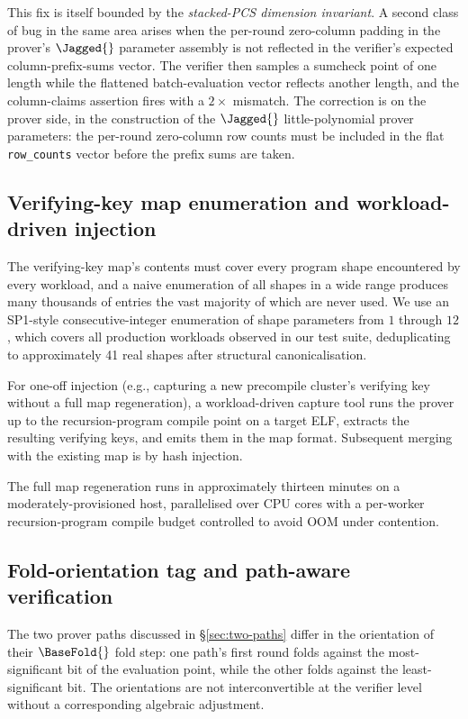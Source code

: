 This fix is itself bounded by the \emph{stacked-PCS dimension invariant}. A second class of bug in the same area arises when the per-round zero-column padding in the prover's $\Jagged{}$ parameter assembly is not reflected in the verifier's expected column-prefix-sums vector. The verifier then samples a sumcheck point of one length while the flattened batch-evaluation vector reflects another length, and the column-claims assertion fires with a $2\times$ mismatch. The correction is on the prover side, in the construction of the $\Jagged{}$ little-polynomial prover parameters: the per-round zero-column row counts must be included in the flat \texttt{row\_counts} vector before the prefix sums are taken.

\subsection{Verifying-key map enumeration and workload-driven injection}

The verifying-key map's contents must cover every program shape encountered by every workload, and a naive enumeration of all shapes in a wide range produces many thousands of entries the vast majority of which are never used. We use an SP1-style consecutive-integer enumeration of shape parameters from $1$ through $12$, which covers all production workloads observed in our test suite, deduplicating to approximately 41 real shapes after structural canonicalisation.

For one-off injection (e.g., capturing a new precompile cluster's verifying key without a full map regeneration), a workload-driven capture tool runs the prover up to the recursion-program compile point on a target ELF, extracts the resulting verifying keys, and emits them in the map format. Subsequent merging with the existing map is by hash injection.

The full map regeneration runs in approximately thirteen minutes on a moderately-provisioned host, parallelised over CPU cores with a per-worker recursion-program compile budget controlled to avoid OOM under contention.

\subsection{Fold-orientation tag and path-aware verification}
\label{sec:fold-orientation}

The two prover paths discussed in \S\ref{sec:two-paths} differ in the orientation of their $\BaseFold{}$ fold step: one path's first round folds against the most-significant bit of the evaluation point, while the other folds against the least-significant bit. The orientations are not interconvertible at the verifier level without a corresponding algebraic adjustment.

